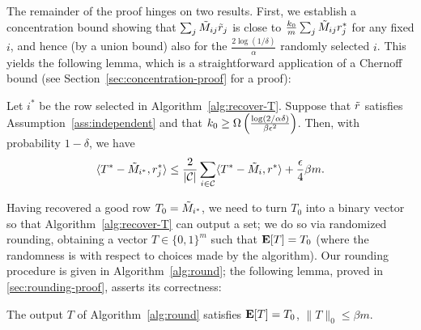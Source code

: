 The remainder of the proof hinges on two results. First, we establish 
a concentration bound showing that $\sum_j \tilde{M}_{ij}\tilde{r}_j$ is close to 
$\frac{k_0}{m}\sum_j \tilde{M}_{ij}r^*_j$ for any fixed $i$, and hence (by a union bound) 
also for the $\frac{2\log(1/\delta)}{\alpha}$ randomly selected $i$. 
This yields the following lemma, which is a straightforward 
application of a Chernoff bound (see Section~\ref{sec:concentration-proof} for a proof):
\begin{lemma}
\label{lem:robs-rtrue}
Let $i^*$ be the row selected in Algorithm~\ref{alg:recover-T}. 
Suppose that $\tilde{r}$ satisfies Assumption~\ref{ass:independent} and that
$k_0 \geq \Omega\left( \frac{\log(2/\alpha\delta)}{\beta\epsilon^2} \right)$. 
Then, with probability $1-\delta$, we have
\begin{equation}
\label{eq:robs-rtrue}
\langle T^*-\tilde{M}_{i^*}, r^*_j \rangle \leq \frac{2}{|\mathcal{C}|} \sum_{i \in \mathcal{C}} \langle T^* - \tilde{M}_i, r^* \rangle + \frac{\epsilon}{4}\beta m.
\end{equation}
\end{lemma}

Having recovered a good row $T_0 = \tilde{M}_{i^*}$, 
we need to turn $T_0$ into a binary vector so that 
Algorithm~\ref{alg:recover-T} can output a set;
we do so via randomized rounding, obtaining a vector $T \in \{0,1\}^m$ such that 
$\mathbf{E}[T] = T_0$ (where the randomness is with respect to choices made by the algorithm).
Our rounding procedure is given in Algorithm~\ref{alg:round}; the following 
lemma, proved in \ref{sec:rounding-proof}, asserts its correctness:
\begin{lemma}
\label{lem:rounding}
The output $T$ of Algorithm~\ref{alg:round} satisfies $\mathbf{E}[T] = T_0$, 
$\|T\|_0 \leq \beta m$.
\end{lemma}



